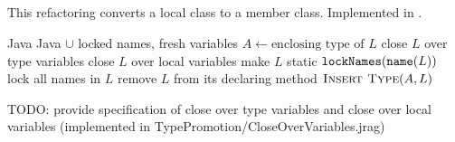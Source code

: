 \subsection{}
This refactoring converts a local class to a member class. Implemented in .

\begin{algorithm}
\caption{$\refactoring{Convert Local to Member Class}(L : \type{LocalClass}) : \type{MemberType}$}
\begin{algorithmic}[1]
\REQUIRE Java
\ENSURE Java $\cup$ locked names, fresh variables
\medskip
\STATE $A \leftarrow \text{enclosing type of $L$}$
\STATE close $L$ over type variables
\STATE close $L$ over local variables
  \STATE make $L$ static
\ENDIF
\STATE $\text{\texttt{lockNames}}(\text{\texttt{name}}(L))$
\STATE lock all names in $L$
\STATE remove $L$ from its declaring method
\STATE $\textsc{Insert Type}(A, L)$
\end{algorithmic}
\end{algorithm}

TODO: provide specification of close over type variables and close over local variables (implemented in TypePromotion/CloseOverVariables.jrag)

